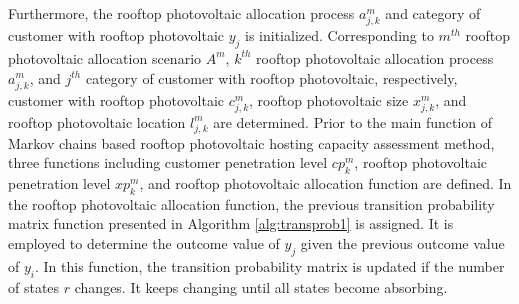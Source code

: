 \egroup
Furthermore, the rooftop photovoltaic allocation process $a^m_{j,k}$ and category of customer with rooftop photovoltaic $y_j$ is initialized. Corresponding to $m^{th}$ rooftop photovoltaic allocation scenario $A^m$, $k^{th}$ rooftop photovoltaic allocation process $a^m_{j,k}$, and $j^{th}$ category of customer with rooftop photovoltaic, respectively, customer with rooftop photovoltaic $c^m_{j,k}$, rooftop photovoltaic size $x^m_{j,k}$, and rooftop photovoltaic location $l^m_{j,k}$ are determined. Prior to the main function of Markov chains based rooftop photovoltaic hosting capacity assessment method, three functions including customer penetration level $cp^m_k$, rooftop photovoltaic penetration level $xp^m_k$, and rooftop photovoltaic allocation function are defined. In the rooftop photovoltaic allocation function, the previous transition probability matrix function presented in Algorithm \ref{alg:transprob1} is assigned. It is employed to determine the outcome value of $y_j$ given the previous outcome value of $y_i$. In this function, the transition probability matrix is updated if the number of states $r$ changes. It keeps changing until all states become absorbing.

